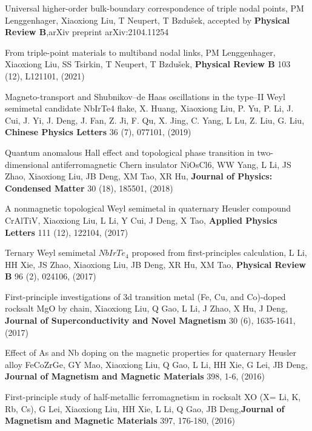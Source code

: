 \documentclass[11pt,a4paper,sans]{moderncv} %
\begin{document}
\begin{etaremune}
  \item Universal higher-order bulk-boundary correspondence of triple nodal points, PM Lenggenhager, \textcolor{cvblue}{Xiaoxiong Liu}, T Neupert, T Bzdušek, accepted by \textbf{Physical Review B},arXiv preprint arXiv:2104.11254
  \item From triple-point materials to multiband nodal links, PM Lenggenhager, \textcolor{cvblue}{Xiaoxiong Liu}, SS Tsirkin, T Neupert, T Bzdušek, \textbf{Physical Review B} 103 (12), L121101, (2021)
  \item Magneto-transport and Shubnikov–de Haas oscillations in the type–II Weyl semimetal candidate NbIrTe4 flake, X. Huang, \textcolor{cvblue}{Xiaoxiong Liu}, P. Yu, P. Li, J. Cui, J. Yi, J. Deng, J. Fan, Z. Ji, F. Qu, X. Jing, C. Yang, L Lu, Z. Liu, G. Liu, \textbf{Chinese Physics Letters} 36 (7), 077101, (2019)
  \item Quantum anomalous Hall effect and topological phase transition in two-dimensional antiferromagnetic Chern insulator NiOsCl6, WW Yang, L Li, JS Zhao, \textcolor{cvblue}{Xiaoxiong Liu}, JB Deng, XM Tao, XR Hu, \textbf{Journal of Physics: Condensed Matter} 30 (18), 185501, (2018)
  \item A nonmagnetic topological Weyl semimetal in quaternary Heusler compound CrAlTiV, \textcolor{cvblue}{Xiaoxiong Liu}, L Li, Y Cui, J Deng, X Tao, \textbf{Applied Physics Letters} 111 (12), 122104, (2017)
  \item Ternary Weyl semimetal $NbIrTe_4$ proposed from first-principles calculation, L Li, HH Xie, JS Zhao, \textcolor{cvblue}{Xiaoxiong Liu}, JB Deng, XR Hu, XM Tao, \textbf{Physical Review B} 96 (2), 024106, (2017)
  \item First-principle investigations of 3d transition metal (Fe, Cu, and Co)-doped rocksalt MgO by chain, \textcolor{cvblue}{Xiaoxiong Liu}, Q Gao, L Li, J Zhao, X Hu, J Deng, \textbf{Journal of Superconductivity and Novel Magnetism} 30 (6), 1635-1641, (2017)
  \item Effect of As and Nb doping on the magnetic properties for quaternary Heusler alloy FeCoZrGe, GY Mao, \textcolor{cvblue}{Xiaoxiong Liu}, Q Gao, L Li, HH Xie, G Lei, JB Deng, \textbf{Journal of Magnetism and Magnetic Materials} 398, 1-6, (2016)
  \item First-principle study of half-metallic ferromagnetism in rocksalt XO (X= Li, K, Rb, Cs), G Lei, \textcolor{cvblue}{Xiaoxiong Liu}, HH Xie, L Li, Q Gao, JB Deng,\textbf{Journal of Magnetism and Magnetic Materials} 397, 176-180, (2016)

\end{etaremune}









\end{document}
